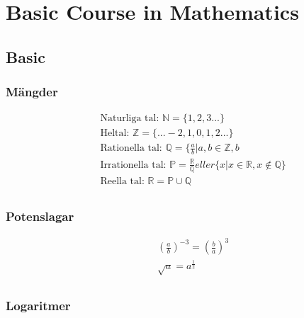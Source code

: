\chapter{Basic Course in Mathematics}

\newpage

\begin{multicols}{2}
\section{Basic}
\subsection{Mängder}
\begin{align*}
  &\quad \text{Naturliga tal: } \mathbb{N} = \{ 1, 2 , 3 ...  \} \\
  &\quad \text{Heltal: }\mathbb{Z} = \{... -2, 1, 0, 1, 2 ...  \} \\
  &\quad \text{Rationella tal: }\mathbb{Q} = \{ \frac{a}{b} | a,b \in \mathbb{Z}, b \\
  &\quad \text{Irrationella tal: }\mathbb{P} = \frac{\mathbb{R}}{\mathbb{Q}}eller \{ x | x \in \mathbb{R}, x \notin \mathbb{Q} \} \\
  &\quad \text{Reella tal: }\mathbb{R} =  \mathbb{P} \cup \mathbb{Q} \\
\end{align*}


\subsection{Potenslagar}
\begin{align*}
  &\quad (\frac{a}{b})^{-3} = (\frac{b}{a})^{3}\\
  &\quad \sqrt{a} = a^{\frac{1}{2}} \\
\end{align*}


\subsection{Logaritmer}
%



\end{multicols}
